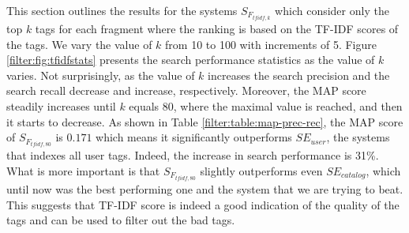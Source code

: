 This section outlines the results for the systems $S_{F_{tfidf,k}}$ which consider only the top $k$ tags for each fragment where the ranking is based on the TF-IDF scores of the tags. We vary the value of $k$ from 10 to 100 with increments of 5. Figure \ref{filter:fig:tfidfstats} presents the search performance statistics as the value of $k$ varies. Not surprisingly, as the value of $k$ increases the search precision and the search recall decrease and increase, respectively. Moreover, the MAP score steadily increases until $k$ equals 80, where the maximal value is reached, and then it starts to decrease. As shown in Table \ref{filter:table:map-prec-rec}, the MAP score of $S_{F_{tfidf,80}}$ is $0.171$ which means it significantly outperforms $SE_{user}$, the systems that indexes all user tags. Indeed, the increase in search performance is 31\%. What is more important is that $S_{F_{tfidf,80}}$ slightly outperforms even $SE_{catalog}$, which until now was the best performing one and the system that we are trying to beat. This suggests that TF-IDF score is indeed a good indication of the quality of the tags and can be used to filter out the bad tags.

